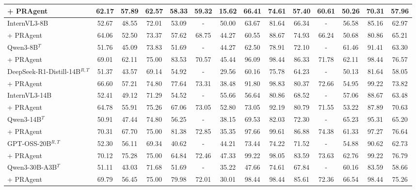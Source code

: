 \begin{table*}[t!]
{\begin{tabular}{l|cc|cccccc|cccc|c}
\rowcolor[rgb]{0.928, 0.936, 0.997}
+ PRAgent & 62.17 & 57.89 & 62.57 & 58.33 & 59.32 & 15.62 & 66.41 & 74.61 & 57.40 & 60.61 & 50.26 & 70.31 & 57.96 \\
\midrule
InternVL3-8B & 52.67 & 48.55 & 72.01 & 53.09 & - & 50.00 & 63.67 & 81.64 & 66.34 & - & 56.58 & 85.16 & 62.97 \\
\rowcolor[rgb]{0.928, 0.936, 0.997}
+ PRAgent & 64.06 & 52.50 & 73.37 & 57.62 & 68.75 & 44.27 & 60.55 & 88.67 & 74.93 & 66.24 & 50.68 & 80.86 & 65.21 \\
\midrule
Qwen3-8B$^{T}$ & 51.76 & 45.09 & 73.83 & 51.69 & - & 44.27 & 62.50 & 78.91 & 72.10 & - & 61.46 & 91.41 & 63.30 \\
\rowcolor[rgb]{0.928, 0.936, 0.997}
+ PRAgent & 69.01 & 62.11 & 75.00 & 83.53 & 70.57 & 45.44 & 96.09 & 98.44 & 86.33 & 71.78 & 62.11 & 98.44 & 76.57 \\
\midrule
DeepSeek-R1-Distill-14B$^{R,T}$ & 51.37 & 43.57 & 69.14 & 54.92 & - & 29.56 & 60.16 & 75.78 & 64.23 & - & 50.13 & 81.64 & 58.05 \\
\rowcolor[rgb]{0.928, 0.936, 0.997}
+ PRAgent & 66.60 & 57.21 & 74.80 & 77.64 & 73.31 & 38.48 & 91.80 & 98.83 & 80.37 & 72.66 & 54.95 & 99.22 & 73.82 \\
\midrule
InternVL3-14B & 52.41 & 49.12 & 71.29 & 54.52 & - & 55.66 & 56.64 & 80.86 & 68.52 & - & 57.06 & 88.67 & 63.48 \\
\rowcolor[rgb]{0.928, 0.936, 0.997}
+ PRAgent & 64.78 & 55.91 & 75.26 & 67.06 & 73.05 & 52.80 & 73.05 & 92.19 & 80.79 & 71.55 & 53.22 & 87.89 & 70.63 \\
\midrule
Qwen3-14B$^{T}$ & 50.91 & 47.44 & 74.80 & 56.25 & - & 38.15 & 69.53 & 82.03 & 72.30 & - & 65.23 & 95.31 & 65.20 \\
\rowcolor[rgb]{0.928, 0.936, 0.997}
+ PRAgent & 70.31 & 67.70 & 75.00 & 81.38 & 72.85 & 35.35 & 97.66 & 99.61 & 86.88 & 74.38 & 61.33 & 97.27 & 76.64 \\
\midrule
GPT-OSS-20B$^{R,T}$ & 52.30 & 56.11 & 69.34 & 40.62 & - & 44.21 & 73.44 & 74.22 & 71.52 & - & 54.88 & 90.62 & 62.73 \\
\rowcolor[rgb]{0.928, 0.936, 0.997}
+ PRAgent & 70.12 & 75.28 & 75.00 & 64.84 & 72.46 & 47.33 & 99.22 & 98.05 & 83.59 & 73.63 & 62.76 & 99.22 & 76.79 \\
\midrule
Qwen3-30B-A3B$^{T}$ & 51.11 & 43.03 & 71.68 & 51.69 & - & 35.22 & 47.66 & 74.61 & 67.84 & - & 60.16 & 83.59 & 58.66 \\
\rowcolor[rgb]{0.928, 0.936, 0.997}
+ PRAgent & 69.79 & 56.45 & 75.00 & 79.98 & 72.01 & 30.01 & 98.44 & 98.44 & 85.61 & 72.36 & 66.54 & 98.44 & 75.26 \\

\end{tabular}}
\end{table*}
